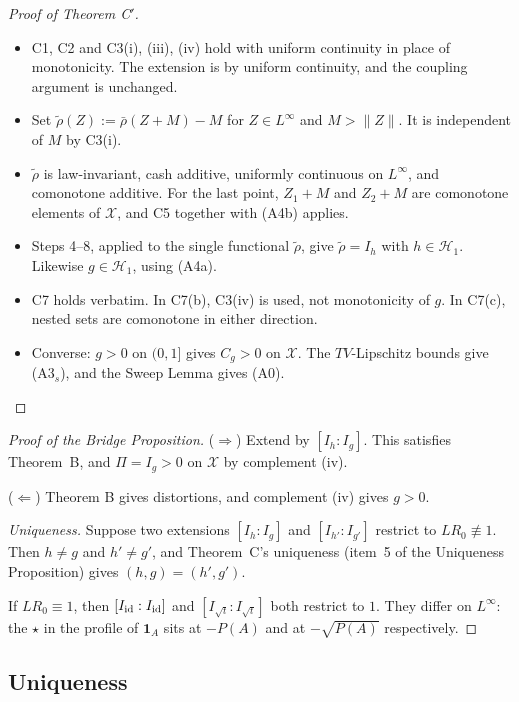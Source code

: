 \begin{proof}[Proof of Theorem C$'$]
\begin{itemize}
\item C1, C2 and C3(i), (iii), (iv) hold with uniform continuity in place of monotonicity. The extension is by uniform continuity, and the coupling argument is unchanged.
\item Set $\tilde\rho(Z):=\bar\rho(Z+M)-M$ for $Z\in L^\infty$ and $M>\|Z\|$. It is independent of $M$ by C3(i).
\item $\tilde\rho$ is law-invariant, cash additive, uniformly continuous on $L^\infty$, and comonotone additive. For the last point, $Z_1+M$ and $Z_2+M$ are comonotone elements of $\mathcal X$, and C5 together with (A4b) applies.
\item Steps 4--8, applied to the single functional $\tilde\rho$, give $\tilde\rho=I_h$ with $h\in\mathcal H_1$. Likewise $g\in\mathcal H_1$, using (A4a).
\item C7 holds verbatim. In C7(b), C3(iv) is used, not monotonicity of $g$. In C7(c), nested sets are comonotone in either direction.
\item Converse: $g>0$ on $(0,1]$ gives $C_g>0$ on $\mathcal X$. The $TV$-Lipschitz bounds give (A3$_s$), and the Sweep Lemma gives (A0).
\end{itemize}
\end{proof}

\begin{proof}[Proof of the Bridge Proposition]
($\Rightarrow$) Extend by $[I_h:I_g]$. This satisfies Theorem~B, and $\Pi=I_g>0$ on $\mathcal X$ by complement (iv).

($\Leftarrow$) Theorem B gives distortions, and complement (iv) gives $g>0$.

\emph{Uniqueness.} Suppose two extensions $[I_h:I_g]$ and $[I_{h'}:I_{g'}]$ restrict to $LR_0\not\equiv1$. Then $h\neq g$ and $h'\ne g'$, and Theorem~C's uniqueness (item~5 of the Uniqueness Proposition) gives $(h,g)=(h',g')$.

If $LR_0\equiv1$, then $[I_{\rm id}:I_{\rm id}]$ and $[I_{\sqrt t}:I_{\sqrt t}]$ both restrict to $1$. They differ on $L^\infty$: the $\star$ in the profile of $\mathbf 1_A$ sits at $-P(A)$ and at $-\sqrt{P(A)}$ respectively.
\end{proof}

\subsection{Uniqueness}

